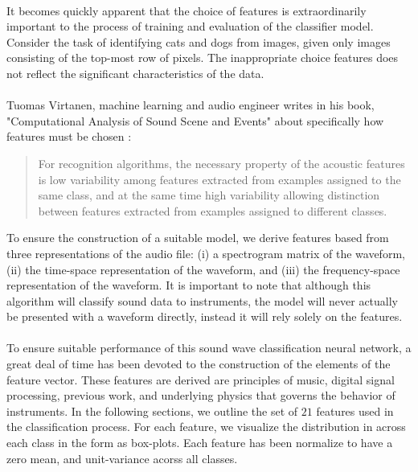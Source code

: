 \documentclass[12pt,letterpaper]{article}
\begin{document}
\paragraph*{}It becomes quickly apparent that the choice of features is extraordinarily important to the process of training and evaluation of the classifier model. Consider the task of identifying cats and dogs from images, given only images consisting of the top-most row of pixels. The inappropriate choice features does not reflect the significant characteristics of the data.

\paragraph*{}Tuomas Virtanen, machine learning and audio engineer writes in his book, "Computational Analysis of Sound Scene and Events" about specifically how features must be chosen \cite{Virtanen}:
\begin{quote}
For recognition algorithms, the necessary property of the acoustic features is low variability among features extracted from examples assigned to the same class, and at the same time high variability allowing distinction between features extracted from examples assigned to different classes.
\end{quote}
To ensure the construction of a suitable model, we derive features based from three representations of the audio file: (i) a spectrogram matrix of the waveform, (ii) the time-space representation of the waveform, and (iii) the frequency-space representation of the waveform. It is important to note that although this algorithm will classify sound data to instruments, the model will never actually be presented with a waveform directly, instead it will rely solely on the features.

\paragraph*{}To ensure suitable performance of this sound wave classification neural network, a great deal of time has been devoted to the construction of the elements of the feature vector. These features are derived are principles of music, digital signal processing, previous work, and underlying physics that governs the behavior of instruments. In the following sections, we outline the set of $21$ features used in the classification process. For each feature, we visualize the distribution in across each class in the form as box-plots. Each feature has been normalize to have a zero mean, and unit-variance acorss all classes. 
\end{document}
